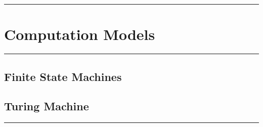\documentclass[]{book}
\begin{document}
\begin{center}\rule{0.5\linewidth}{\linethickness}\end{center}

\chapter{Computation Models}\label{computation-models}

\begin{center}\rule{0.5\linewidth}{\linethickness}\end{center}

\section{Finite State Machines}\label{finite-state-machines}

\section{Turing Machine}\label{turing-machine}

\begin{center}\rule{0.5\linewidth}{\linethickness}\end{center}


\end{document}
